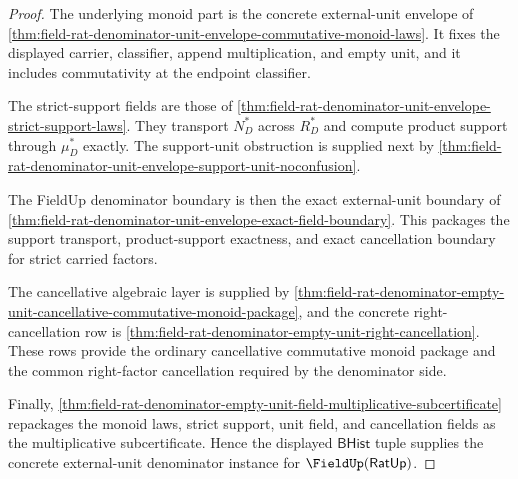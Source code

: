 \begin{proof}
The underlying monoid part is the concrete external-unit envelope of
\autoref{thm:field-rat-denominator-unit-envelope-commutative-monoid-laws}. It
fixes the displayed carrier, classifier, append multiplication, and empty unit,
and it includes commutativity at the endpoint classifier.

The strict-support fields are those of
\autoref{thm:field-rat-denominator-unit-envelope-strict-support-laws}. They
transport $N_D^\ast$ across $R_D^\ast$ and compute product support through
$\mu_D^\ast$ exactly. The support-unit obstruction is supplied next by
\autoref{thm:field-rat-denominator-unit-envelope-support-unit-noconfusion}.

The FieldUp denominator boundary is then the exact external-unit boundary of
\autoref{thm:field-rat-denominator-unit-envelope-exact-field-boundary}. This
packages the support transport, product-support exactness, and exact
cancellation boundary for strict carried factors.

The cancellative algebraic layer is supplied by
\autoref{thm:field-rat-denominator-empty-unit-cancellative-commutative-monoid-package},
and the concrete right-cancellation row is
\autoref{thm:field-rat-denominator-empty-unit-right-cancellation}. These rows
provide the ordinary cancellative commutative monoid package and the common
right-factor cancellation required by the denominator side.

Finally,
\autoref{thm:field-rat-denominator-empty-unit-field-multiplicative-subcertificate}
repackages the monoid laws, strict support, unit field, and cancellation fields
as the multiplicative subcertificate. Hence the displayed $\mathsf{BHist}$
tuple supplies the concrete external-unit denominator instance for
$\FieldUp(\mathsf{RatUp})$.
\end{proof}
